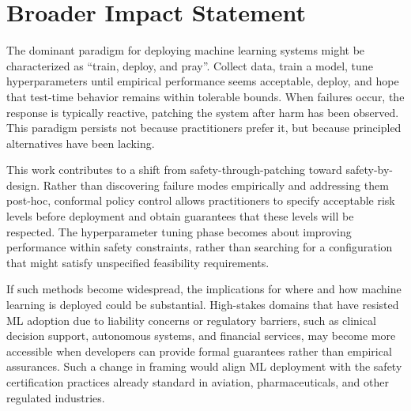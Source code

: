 \section*{Broader Impact Statement}

The dominant paradigm for deploying machine learning systems might be characterized as ``train, deploy, and pray''. Collect data, train a model, tune hyperparameters until empirical performance seems acceptable, deploy, and hope that test-time behavior remains within tolerable bounds. When failures occur, the response is typically reactive, patching the system after harm has been observed. This paradigm persists not because practitioners prefer it, but because principled alternatives have been lacking.

This work contributes to a shift from safety-through-patching toward safety-by-design. Rather than discovering failure modes empirically and addressing them post-hoc, conformal policy control allows practitioners to specify acceptable risk levels before deployment and obtain guarantees that these levels will be respected. The hyperparameter tuning phase becomes about improving performance within safety constraints, rather than searching for a configuration that might satisfy unspecified feasibility requirements.

If such methods become widespread, the implications for where and how machine learning is deployed could be substantial. High-stakes domains that have resisted ML adoption due to liability concerns or regulatory barriers, such as clinical decision support, autonomous systems, and financial services, may become more accessible when developers can provide formal guarantees rather than empirical assurances. Such a change in framing would align ML deployment with the safety certification practices already standard in aviation, pharmaceuticals, and other regulated industries.

